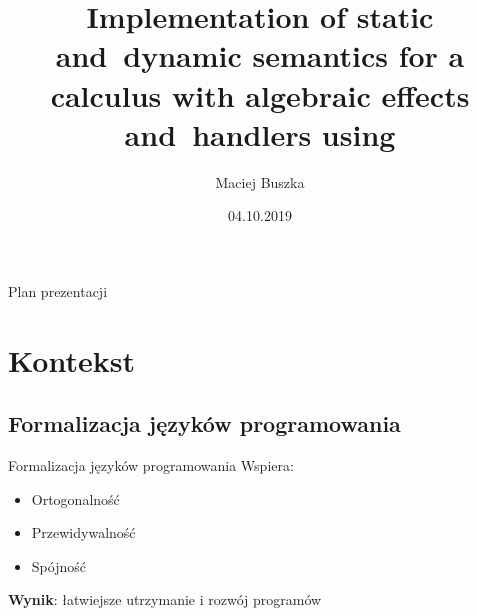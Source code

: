 \documentclass{beamer}
\title[A calculus with algebraic effects and~handlers]{Implementation of static and~dynamic semantics for a calculus with algebraic effects and~handlers using \Redex}
\author{Maciej Buszka}
\institute{Instytut Informatyki UWr}
\date{04.10.2019}
\begin{document}
\begin{frame}
  \titlepage
\end{frame}

\begin{frame}{Plan prezentacji}
  \tableofcontents
\end{frame}


\section{Kontekst}

\subsection{Formalizacja języków programowania}

\begin{frame}{Formalizacja języków programowania}
  Wspiera:
  \begin{itemize}
    \item Ortogonalność
    \item Przewidywalność
    \item Spójność
  \end{itemize} 
  \vspace{\baselineskip}
  \textbf{Wynik}: łatwiejsze utrzymanie i rozwój programów \\ %
\end{frame}


\end{document}
